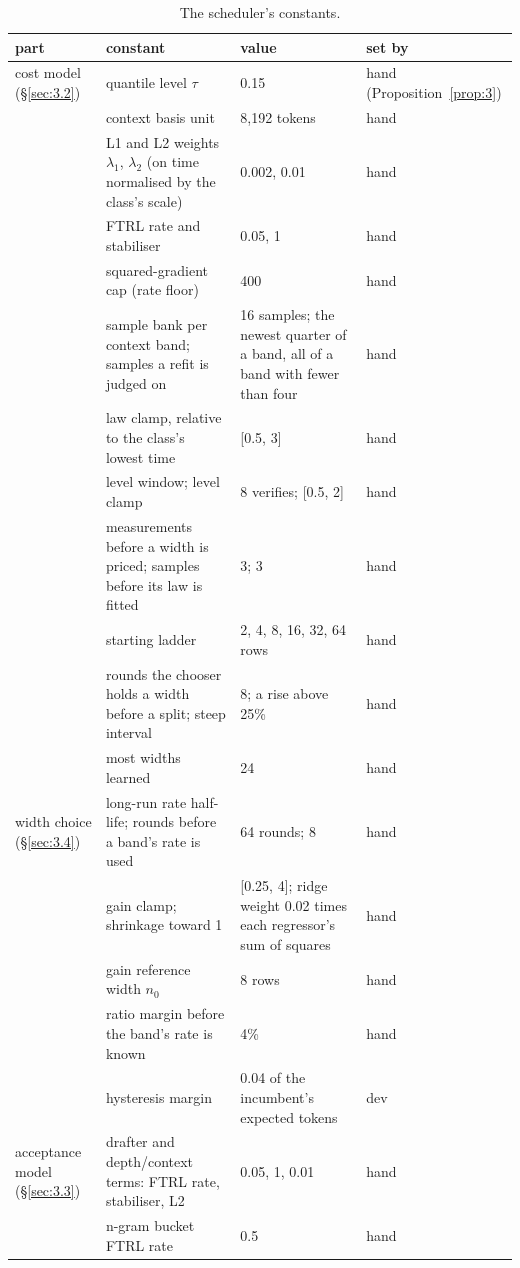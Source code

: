 \documentclass[10pt,twocolumn,letterpaper]{article}
\begin{document}
\begin{table}[t]
\centering\small
\caption{The scheduler's constants.}
\label{tab:constants}
\setlength{\tabcolsep}{4pt}
\begin{tabularx}{\textwidth}{lXXl}
\toprule
\rowcolor{head}\textbf{part} & \textbf{constant} & \textbf{value} & \textbf{set by} \\
\midrule
cost model (\S\ref{sec:3.2}) & quantile level $\tau$ & 0.15 & hand (Proposition~\ref{prop:3}) \\
 & context basis unit & 8,192 tokens & hand \\
 & L1 and L2 weights $\lambda_{1}$, $\lambda_{2}$ (on time normalised by the class's scale) & 0.002, 0.01 & hand \\
 & FTRL rate and stabiliser & 0.05, 1 & hand \\
 & squared-gradient cap (rate floor) & 400 & hand \\
 & sample bank per context band; samples a refit is judged on & 16 samples; the newest quarter of a band, all of a band with fewer than four & hand \\
 & law clamp, relative to the class's lowest time & [0.5, 3] & hand \\
 & level window; level clamp & 8 verifies; [0.5, 2] & hand \\
 & measurements before a width is priced; samples before its law is fitted & 3; 3 & hand \\
 & starting ladder & 2, 4, 8, 16, 32, 64 rows & hand \\
 & rounds the chooser holds a width before a split; steep interval & 8; a rise above 25\% & hand \\
 & most widths learned & 24 & hand \\
width choice (\S\ref{sec:3.4}) & long-run rate half-life; rounds before a band's rate is used & 64 rounds; 8 & hand \\
 & gain clamp; shrinkage toward 1 & [0.25, 4]; ridge weight 0.02 times each regressor's sum of squares & hand \\
 & gain reference width $n_{0}$ & 8 rows & hand \\
 & ratio margin before the band's rate is known & 4\% & hand \\
 & hysteresis margin & 0.04 of the incumbent's expected tokens & dev \\
acceptance model (\S\ref{sec:3.3}) & drafter and depth/context terms: FTRL rate, stabiliser, L2 & 0.05, 1, 0.01 & hand \\
 & n-gram bucket FTRL rate & 0.5 & hand \\

\end{tabularx}
\end{table}
\end{document}
